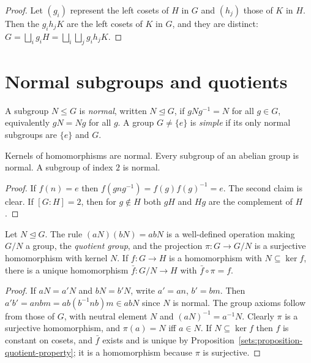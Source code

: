 \begin{proof}
Let $(g_i)$ represent the left cosets of $H$ in $G$ and $(h_j)$ those of $K$ in $H$.
Then the $g_i h_j K$ are the left cosets of $K$ in $G$, and they are distinct:
$G = \bigsqcup_i g_i H = \bigsqcup_i \bigsqcup_j g_i h_j K$.
\end{proof}

\section{Normal subgroups and quotients}\label{groups:section-quotients}

\begin{definition}\label{groups:definition-normal}
A subgroup $N \leq G$ is \emph{normal}, written $N \trianglelefteq G$, if
$gNg^{-1} = N$ for all $g \in G$, equivalently $gN = Ng$ for all $g$. A group
$G \neq \{e\}$ is \emph{simple} if its only normal subgroups are $\{e\}$ and $G$.
\end{definition}

\begin{lemma}\label{groups:lemma-normal-examples}
Kernels of homomorphisms are normal. Every subgroup of an abelian group is
normal. A subgroup of index $2$ is normal.
\end{lemma}

\begin{proof}
If $f(n) = e$ then $f(gng^{-1}) = f(g)f(g)^{-1} = e$. The second claim is clear.
If $[G:H] = 2$, then for $g \notin H$ both $gH$ and $Hg$ are the complement of $H$.
\end{proof}

\begin{theorem}\label{groups:theorem-quotient}
Let $N \trianglelefteq G$. The rule $(aN)(bN) = abN$ is a well-defined operation
making $G/N$ a group, the \emph{quotient group}, and the projection
$\pi \colon G \to G/N$ is a surjective homomorphism with kernel $N$. If
$f \colon G \to H$ is a homomorphism with $N \subseteq \ker f$, there is a unique
homomorphism $\bar f \colon G/N \to H$ with $\bar f \circ \pi = f$.
\end{theorem}

\begin{proof}
If $aN = a'N$ and $bN = b'N$, write $a' = an$, $b' = bm$. Then
$a'b' = anbm = ab(b^{-1}nb)m \in abN$ since $N$ is normal. The group axioms follow
from those of $G$, with neutral element $N$ and $(aN)^{-1} = a^{-1}N$. Clearly $\pi$
is a surjective homomorphism, and $\pi(a) = N$ iff $a \in N$. If $N \subseteq \ker f$
then $f$ is constant on cosets, and $\bar f$ exists and is unique by
Proposition~\ref{sets:proposition-quotient-property}; it is a homomorphism because
$\pi$ is surjective.
\end{proof}


